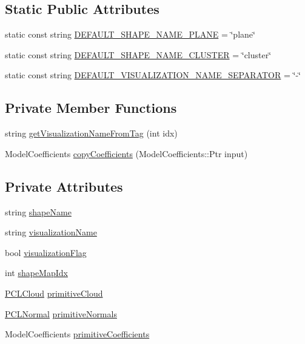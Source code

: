 \subsection*{Static Public Attributes}
\begin{DoxyCompactItemize}
\item 
static const string \hyperlink{classpcp_1_1PCPrimitive_a640bb9e84b55d900e6edbaef8b938d6e}{D\-E\-F\-A\-U\-L\-T\-\_\-\-S\-H\-A\-P\-E\-\_\-\-N\-A\-M\-E\-\_\-\-P\-L\-A\-N\-E} = \char`\"{}plane\char`\"{}
\item 
static const string \hyperlink{classpcp_1_1PCPrimitive_ab54a8fb25b750b3808d652f25161ba02}{D\-E\-F\-A\-U\-L\-T\-\_\-\-S\-H\-A\-P\-E\-\_\-\-N\-A\-M\-E\-\_\-\-C\-L\-U\-S\-T\-E\-R} = \char`\"{}cluster\char`\"{}
\item 
static const string \hyperlink{classpcp_1_1PCPrimitive_a9dc28983a955e1f9b1813a15e4260386}{D\-E\-F\-A\-U\-L\-T\-\_\-\-V\-I\-S\-U\-A\-L\-I\-Z\-A\-T\-I\-O\-N\-\_\-\-N\-A\-M\-E\-\_\-\-S\-E\-P\-A\-R\-A\-T\-O\-R} = \char`\"{}-\/\char`\"{}
\end{DoxyCompactItemize}
\subsection*{Private Member Functions}
\begin{DoxyCompactItemize}
\item 
string \hyperlink{classpcp_1_1PCPrimitive_a0764e20850fd7392f657d1cc43e8ec77}{get\-Visualization\-Name\-From\-Tag} (int idx)
\item 
Model\-Coefficients \hyperlink{classpcp_1_1PCPrimitive_a2d8fe7d2a3a6454cb378bdbbff408cf0}{copy\-Coefficients} (Model\-Coefficients\-::\-Ptr input)
\end{DoxyCompactItemize}
\subsection*{Private Attributes}
\begin{DoxyCompactItemize}
\item 
string \hyperlink{classpcp_1_1PCPrimitive_a120d0dd6120b9fe1af74d698d40adb1c}{shape\-Name}
\item 
string \hyperlink{classpcp_1_1PCPrimitive_a8ac9332a85fb342e957959c97012f4d3}{visualization\-Name}
\item 
bool \hyperlink{classpcp_1_1PCPrimitive_a44cc3f58388966da71e1b07b52d3081c}{visualization\-Flag}
\item 
int \hyperlink{classpcp_1_1PCPrimitive_a809c274d155e9b552cf02a0687b7cc11}{shape\-Map\-Idx}
\item 
\hyperlink{PCPrimitive_8h_a02a7c0cdfcd324f1b5b87ce549fdbe10}{P\-C\-L\-Cloud} \hyperlink{classpcp_1_1PCPrimitive_accdf8a12234519275d4276b6706d4703}{primitive\-Cloud}
\item 
\hyperlink{PCPrimitive_8h_abe81b5e6ffcc0ceb1b95b0489419027d}{P\-C\-L\-Normal} \hyperlink{classpcp_1_1PCPrimitive_a96359fda0d8c70e3b074d97bde90b282}{primitive\-Normals}
\item 
Model\-Coefficients \hyperlink{classpcp_1_1PCPrimitive_adb0f70b618dddbff203bccd1fa071782}{primitive\-Coefficients}
\end{DoxyCompactItemize}


